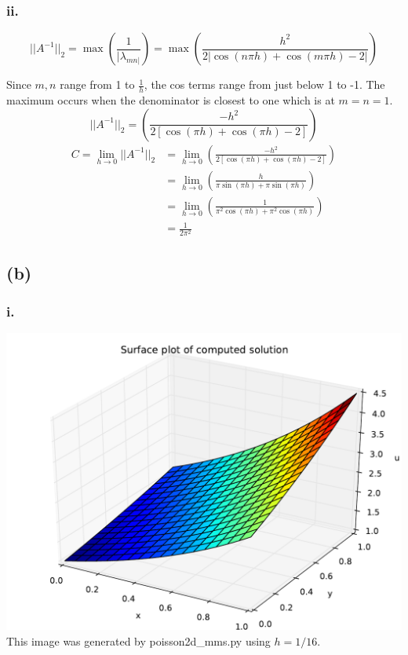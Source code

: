 \documentclass{article}
\begin{document}
\subsubsection*{ii.}
\begin{equation}
||A^{-1}||_2=\max\left(\frac{1}{|\lambda_{mn|}}\right)=\max\left(\frac{h^2}{2|\cos(n\pi h)+\cos(m\pi h)-2|}\right)
\end{equation}

Since $m,n$ range from 1 to $\frac{1}{h}$, the cos terms range from just below 1 to -1. The maximum occurs when the denominator is closest to one which is at $m=n=1$.
\begin{equation}
||A^{-1}||_2=\left(\frac{-h^2}{2[\cos(\pi h)+\cos(\pi h)-2]}\right)
\end{equation}
\begin{align}
C=\lim_{h\to0}||A^{-1}||_2&=\lim_{h\to0}\left(\frac{-h^2}{2[\cos(\pi h)+\cos(\pi h)-2]}\right) \nonumber\\
&=\lim_{h\to0}\left(\frac{h}{\pi\sin(\pi h)+\pi\sin(\pi h)}\right) \nonumber\\
&=\lim_{h\to0}\left(\frac{1}{\pi^2\cos(\pi h)+\pi^2\cos(\pi h)}\right) \nonumber\\
&=\boxed{\frac{1}{2\pi^2}}
\end{align}

\subsection*{(b)}
\subsubsection*{i.}
\includegraphics[width=\linewidth]{bi.pdf}
This image was generated by poisson2d\_mms.py using $h=1/16$.
\end{document}
